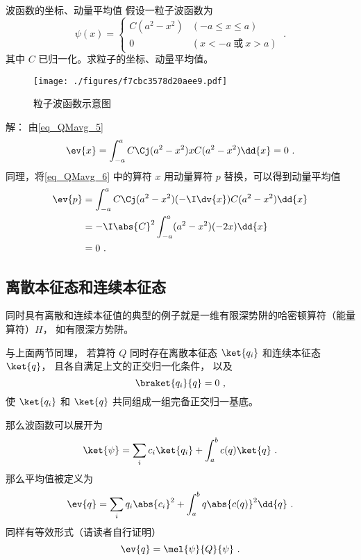 \begin{example}{波函数的坐标、动量平均值}
假设一粒子波函数为
\begin{equation}
\psi(x)=
\begin{cases}
C(a^2-x^2) &(-a\leqslant x\leqslant a)\\
0 &(x<-a \ \text{或}\ x>a) 
\end{cases}~.
\end{equation}
其中 $C$ 已归一化。求粒子的坐标、动量平均值。

\begin{figure}[ht]
\centering
\texttt{[image: ./figures/f7cbc3578d20aee9.pdf]}
\caption{粒子波函数示意图} \label{fig_QMavg_2}
\end{figure}

解： 由\autoref{eq_QMavg_5} 
\begin{equation}\label{eq_QMavg_6}
\ev{x}= \int_{-a}^a C\Cj(a^2-x^2)xC(a^2-x^2)\dd{x} = 0~.
\end{equation}
同理，将\autoref{eq_QMavg_6} 中的算符 $x$ 用动量算符 $p$ 替换，可以得到动量平均值
\begin{equation}
\begin{aligned}
\ev{p} &= \int_{-a}^a C\Cj(a^2-x^2)(-\I\dv{x})C(a^2-x^2)\dd{x}\\
&= -\I\abs{C}^2\int_{-a}^a (a^2-x^2)(-2x)\dd{x}\\
&= 0~.
\end{aligned}
\end{equation}
\end{example}

\subsection{离散本征态和连续本征态}
同时具有离散和连续本征值的典型的例子就是一维有限深势阱的哈密顿算符（能量算符）$H$， 如有限深方势阱。

与上面两节同理， 若算符 $Q$ 同时存在离散本征态 $\ket{q_i}$ 和连续本征态 $\ket{q}$， 且各自满足上文的正交归一化条件， 以及
\begin{equation}
\braket{q_i}{q} = 0~,
\end{equation}
使 $\ket{q_i}$ 和 $\ket{q}$ 共同组成一组完备正交归一基底。

那么波函数可以展开为
\begin{equation}
\ket{\psi} = \sum_i c_i \ket{q_i} + \int_a^b c(q) \ket{q}~.
\end{equation}
那么平均值被定义为
\begin{equation}
\ev{q} = \sum_i q_i \abs{c_i}^2 + \int_a^b q \abs{c(q)}^2 \dd{q}~.
\end{equation}
同样有等效形式（请读者自行证明）
\begin{equation}
\ev{q} = \mel{\psi}{Q}{\psi}~.
\end{equation}

